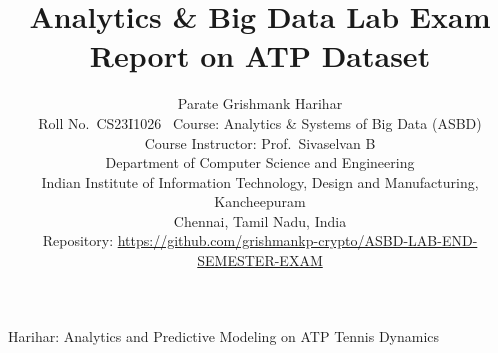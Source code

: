 \documentclass[10pt,journal]{IEEEtran}
\begin{document}
\title{Analytics \& Big Data Lab Exam Report on ATP Dataset}

\author{Parate Grishmank Harihar\\[3pt]
{\normalsize Roll No.\ CS23I1026 \textbullet\ Course: Analytics \& Systems of Big Data (ASBD)}\\
{\normalsize Course Instructor: Prof.\ Sivaselvan B}\\
{\normalsize Department of Computer Science and Engineering}\\
{\normalsize Indian Institute of Information Technology, Design and Manufacturing, Kancheepuram}\\
{\normalsize Chennai, Tamil Nadu, India}\\
{\normalsize Repository: \textcolor{blue}{\url{https://github.com/grishmankp-crypto/ASBD-LAB-END-SEMESTER-EXAM}}}}

%
{Harihar: Analytics and Predictive Modeling on ATP Tennis Dynamics}

\maketitle
\end{document}

